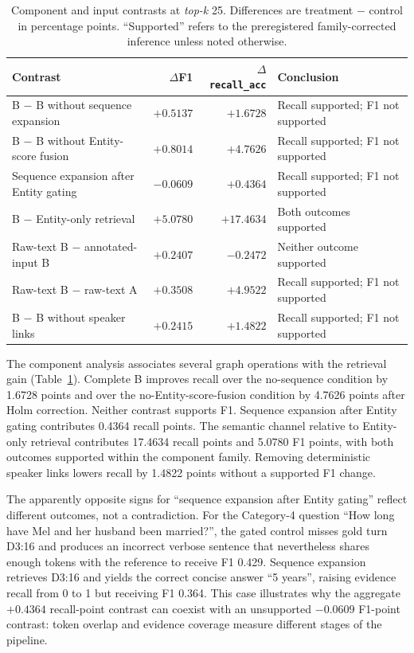 \documentclass[a4paper,twoside]{article}
\newcommand{\recallacc}{\texttt{recall\_acc}}
\newcommand{\topk}{\textit{top-k}}
\begin{document}
\begin{table}[t]
\centering
\caption{Component and input contrasts at \topk{} 25. Differences are
treatment $-$ control in percentage points. ``Supported'' refers to the
preregistered family-corrected inference unless noted otherwise.}
\label{tab:components}
\begin{tabularx}{\textwidth}{@{}Xrrl@{}}
\toprule
Contrast & \(\Delta\)F1 & \(\Delta\)\recallacc{} & Conclusion \\
\midrule
B $-$ B without sequence expansion & \(+0.5137\) & \(+1.6728\) & Recall supported; F1 not supported \\
B $-$ B without Entity-score fusion & \(+0.8014\) & \(+4.7626\) & Recall supported; F1 not supported \\
Sequence expansion after Entity gating & \(-0.0609\) & \(+0.4364\) & Recall supported; F1 not supported \\
B $-$ Entity-only retrieval & \(+5.0780\) & \(+17.4634\) & Both outcomes supported \\
Raw-text B $-$ annotated-input B & \(+0.2407\) & \(-0.2472\) & Neither outcome supported \\
Raw-text B $-$ raw-text A & \(+0.3508\) & \(+4.9522\) & Recall supported; F1 not supported \\
B $-$ B without speaker links & \(+0.2415\) & \(+1.4822\) & Recall supported; F1 not supported \\
\bottomrule
\end{tabularx}
\end{table}

The component analysis associates several graph operations with the retrieval gain
(Table~\ref{tab:components}). Complete B improves recall over the no-sequence
condition by 1.6728 points and over the no-Entity-score-fusion condition by
4.7626 points after Holm correction. Neither contrast supports F1. Sequence
expansion after Entity gating contributes 0.4364 recall points. The semantic
channel relative to Entity-only retrieval contributes 17.4634 recall points
and 5.0780 F1 points, with both outcomes supported within the component
family. Removing deterministic speaker links lowers recall by 1.4822 points
without a supported F1 change.

The apparently opposite signs for ``sequence expansion after Entity gating''
reflect different outcomes, not a contradiction. For the Category-4 question
``How long have Mel and her husband been married?'', the gated control misses
gold turn D3:16 and produces an incorrect verbose sentence that nevertheless
shares enough tokens with the reference to receive F1 0.429. Sequence
expansion retrieves D3:16 and yields the correct concise answer ``5 years'',
raising evidence recall from 0 to 1 but receiving F1 0.364. This case
illustrates why the aggregate $+0.4364$ recall-point contrast can coexist with
an unsupported $-0.0609$ F1-point contrast: token overlap and evidence
coverage measure different stages of the pipeline.
\end{document}
